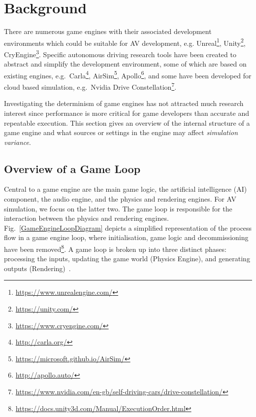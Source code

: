 \documentclass[letterpaper, 10 pt, journal, twoside]{IEEEtran}
\begin{document}
\section{Background} \label{s:background}

There are numerous game engines with their associated development environments which could be suitable for AV development, e.g. Unreal\footnote{\url{https://www.unrealengine.com/}}, Unity\footnote{\url{https://unity.com/}}, CryEngine\footnote{\url{https://www.cryengine.com/}}. Specific autonomous driving research tools have been created to abstract and simplify the development environment, some of which are based on existing engines, e.g.\ Carla\footnote{\url{http://carla.org/}}, AirSim\footnote{\url{https://microsoft.github.io/AirSim/}}, Apollo\footnote{\url{http://apollo.auto/}}, and some have been developed for cloud based simulation, e.g.\ Nvidia Drive Constellation\footnote{\url{https://www.nvidia.com/en-gb/self-driving-cars/drive-constellation/}}.

Investigating the determinism of game engines has not attracted much research interest since performance is more critical for game developers than accurate and repeatable execution.  %
This section gives an overview of the internal structure of a game engine and what sources or settings in the engine may affect \textit{simulation variance}.
%

\subsection{Overview of a Game Loop} \label{GameLoopSection}

Central to a game engine are the main game logic, the artificial intelligence (AI) component, the audio engine, and the physics and rendering engines. For AV simulation, we focus on the latter two.
%
The game loop is responsible for the interaction between the physics and rendering engines. Fig.~\ref{GameEngineLoopDiagram} depicts a simplified representation of the process flow in a game engine loop, where  initialisation, game logic and decommissioning have been removed\footnote{\url{https://docs.unity3d.com/Manual/ExecutionOrder.html}}. A game loop is broken up into three distinct phases: processing the inputs, updating the game world (Physics Engine), and generating outputs (Rendering)~\cite{GameEngineArchBook}.
\end{document}
